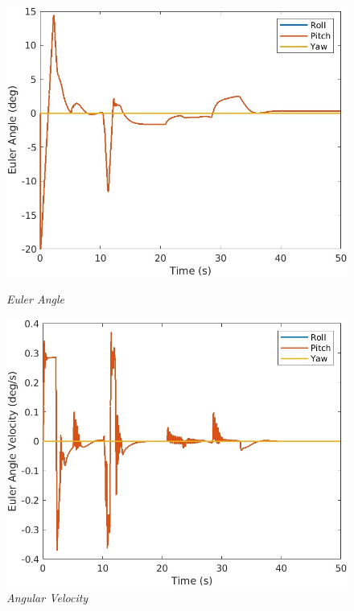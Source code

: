 \begin{figure}[htbp]
  \centering
  \begin{minipage}[b]{0.45\textwidth}
    \centering
    \includegraphics[width=\textwidth]{Images/Control Surface Analysis/4 EulerAngle_1.jpg}
    \caption*{\textit{Euler Angle}}
  \end{minipage}
  \hfil
  \begin{minipage}[b]{0.45\textwidth}
    \centering
    \includegraphics[width=\textwidth]{Images/Control Surface Analysis/6 EulerAngleVelocity_1.jpg}
    \caption*{\textit{Angular Velocity}}
  \end{minipage}

\end{figure}
